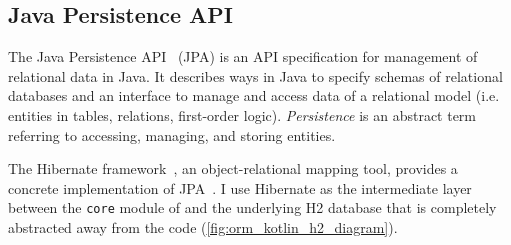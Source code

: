 \subsection{Java Persistence API}

The Java Persistence API~\cite{BiswasJavaPersistenceAPI2016} (JPA) is an API specification for management of relational data in Java.
It describes ways in Java to specify schemas of relational databases and an interface to manage and access data of a relational model (i.e. entities in tables, relations, first-order logic).
\textsl{Persistence} is an abstract term referring to accessing, managing, and storing entities.

The Hibernate framework~\cite{ElliottHibernateDeveloperNotebook2004}, an object-relational mapping tool, provides a concrete implementation of JPA~\cite{BauerJavaPersistenceHibernate2015}.
I use Hibernate as the intermediate layer between the \texttt{core} module of \graffs and the underlying H2 database that is completely abstracted away from the \graffs code (\autoref{fig:orm_kotlin_h2_diagram}).



